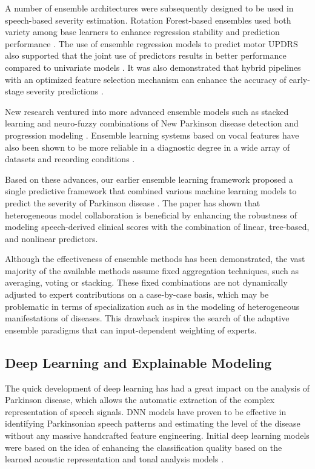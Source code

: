 \documentclass{customIEEEsingle}
\begin{document}
	A number of ensemble architectures were subsequently designed to be used in speech-based severity estimation. Rotation Forest-based ensembles used both variety among base learners to enhance regression stability and prediction performance \cite{sheikhi-2022}. The use of ensemble regression models to predict motor UPDRS also supported that the joint use of predictors results in better performance compared to univariate models \cite{shastry-2023}. It was also demonstrated that hybrid pipelines with an optimized feature selection mechanism can enhance the accuracy of early-stage severity predictions \cite{motamedi-2025,masood-2021}.
	
	New research ventured into more advanced ensemble models such as stacked learning and neuro-fuzzy combinations of New Parkinson disease detection and progression modeling \cite{zhao-2024,omodunbi-2025}. Ensemble learning systems based on vocal features have also been shown to be more reliable in a diagnostic degree in a wide array of datasets and recording conditions \cite{chakole-2025,hassan-2023}.
	
	Based on these advances, our earlier ensemble learning framework proposed a single predictive framework that combined various machine learning models to predict the severity of Parkinson disease \cite{dasgupta-2025}. The paper has shown that heterogeneous model collaboration is beneficial by enhancing the robustness of modeling speech-derived clinical scores with the combination of linear, tree-based, and nonlinear predictors.
	
	Although the effectiveness of ensemble methods has been demonstrated, the vast majority of the available methods assume fixed aggregation techniques, such as averaging, voting or stacking. These fixed combinations are not dynamically adjusted to expert contributions on a case-by-case basis, which may be problematic in terms of specialization such as in the modeling of heterogeneous manifestations of diseases. This drawback inspires the search of the adaptive ensemble paradigms that can input-dependent weighting of experts.
	
	\subsection{Deep Learning and Explainable Modeling}
	
	The quick development of deep learning has had a great impact on the analysis of Parkinson disease, which allows the automatic extraction of the complex representation of speech signals. DNN models have proven to be effective in identifying Parkinsonian speech patterns and estimating the level of the disease without any massive handcrafted feature engineering. Initial deep learning models were based on the idea of enhancing the classification quality based on the learned acoustic representation and tonal analysis models \cite{reddy-2024}.
	
\end{document}
